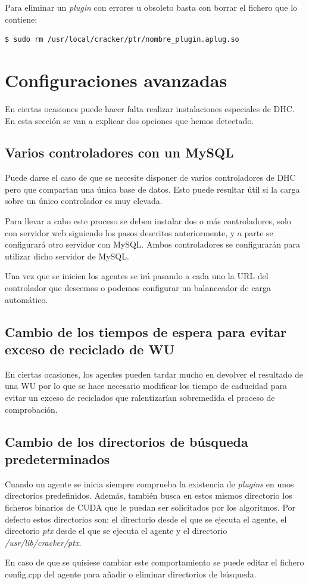 Para eliminar un \emph{plugin} con errores u obsoleto basta con borrar el fichero que lo contiene:

\begin{verbatim}
$ sudo rm /usr/local/cracker/ptr/nombre_plugin.aplug.so	
\end{verbatim}

\section{Configuraciones avanzadas}\label{sec:conf_avanzada}

En ciertas ocasiones puede hacer falta realizar instalaciones especiales de DHC. En esta sección se van a explicar dos opciones que hemos detectado.

\subsection{Varios controladores con un MySQL}
Puede darse el caso de que se necesite disponer de varios controladores de DHC pero que compartan una única base de datos. Esto puede resultar útil si la carga sobre un único controlador es muy elevada.

Para llevar a cabo este proceso se deben instalar dos o más controladores, solo con servidor web siguiendo los pasos descritos anteriormente, y a parte se configurará otro servidor con MySQL. Ambos controladores se configurarán para utilizar dicho servidor de MySQL.

Una vez que se inicien los agentes se irá pasando a cada uno la URL del controlador que deseemos o podemos configurar un balanceador de carga automático.


\subsection{Cambio de los tiempos de espera para evitar exceso de reciclado de WU}
En ciertas ocasiones, los agentes pueden tardar mucho en devolver el resultado de una WU por lo que se hace necesario modificar los tiempo de caducidad para evitar un exceso de reciclados que ralentizarían sobremedida el proceso de comprobación.

\subsection{Cambio de los directorios de búsqueda predeterminados}
Cuando un agente se inicia siempre comprueba la existencia de \emph{plugins} en unos directorios predefinidos. Además, también busca en estos mismos directorio los ficheros binarios de CUDA que le puedan ser solicitados por los algoritmos. Por defecto estos directorios son: el directorio desde el que se ejecuta el agente, el directorio \emph{ptx} desde el que se ejecuta el agente y el directorio \emph{/usr/lib/cracker/ptx}.

En caso de que se quisiese cambiar este comportamiento se puede editar el fichero config.cpp del agente para añadir o eliminar directorios de búsqueda.